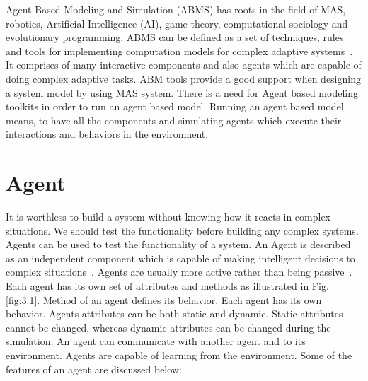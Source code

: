 Agent Based Modeling and Simulation (ABMS) has roots in the field of MAS, robotics, Artificial Intelligence (AI), game theory, computational sociology and evolutionary programming. ABMS can be defined as a set of techniques, rules and tools for implementing computation models for complex adaptive systems~\cite{macal2010}. It comprises of many interactive components and also agents which are capable of doing complex adaptive tasks. ABM tools provide a good support when designing a system model by using MAS system. There is a need for Agent based modeling toolkits in order to run an agent based model. Running an agent based model means, to have all the components and simulating agents which execute their interactions and behaviors in the environment. 

\section{Agent}
\label{section.Agent}

It is worthless to build a system without knowing how it reacts in complex situations. We should test the functionality before building any complex systems. Agents can be used to test the functionality of a system. An Agent is described as an independent component which is capable of making intelligent decisions to complex situations~\cite{Bonabeau2001}. Agents are usually more active rather than being passive~\cite{macal2006}. Each agent has its own set of attributes and methods as illustrated in Fig.\ref{fig:3.1}. Method of an agent defines its behavior. Each agent has its own behavior. Agents attributes can be both static and dynamic. Static attributes cannot be changed, whereas dynamic attributes can be changed during the simulation. An agent can communicate with another agent and to its environment. Agents are capable of learning from the environment. Some of the features of an agent are discussed below:

